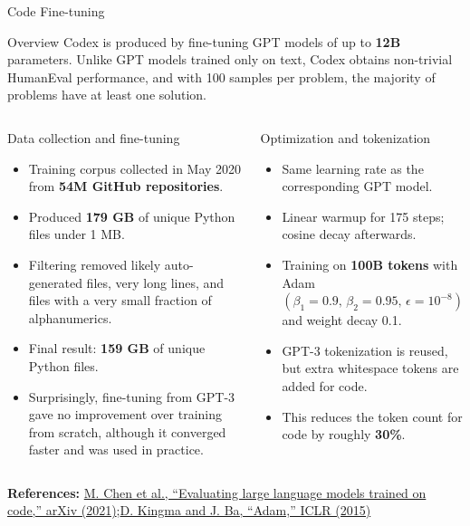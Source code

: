 \documentclass[aspectratio=43,9pt]{beamer}
\newcommand{\srclink}[2]{\href{#2}{\textcolor{black!68}{#1}}}
\newcommand{\sep}{;\hspace{0.35em}}
\newcommand{\refline}[2][References]{%
  \vfill
  {\raggedright\fontsize{5.1}{5.5}\selectfont\color{black!68}\textbf{#1:} #2\par}%
}
\newcommand{\srcChen}{\srclink{M. Chen et al., ``Evaluating large language models trained on code,'' arXiv (2021)}{https://arxiv.org/abs/2107.03374}}
\newcommand{\srcKingmaBa}{\srclink{D. Kingma and J. Ba, ``Adam,'' ICLR (2015)}{https://arxiv.org/abs/1412.6980}}
\begin{document}
\begin{frame}{Code Fine-tuning}
\scriptsize
\begin{block}{Overview}
Codex is produced by fine-tuning GPT models of up to \textbf{12B} parameters. Unlike GPT models trained only on text, Codex obtains non-trivial HumanEval performance, and with 100 samples per problem, the majority of problems have at least one solution.
\end{block}

\begin{columns}[T,totalwidth=\textwidth]
\begin{block}{Data collection and fine-tuning}
\begin{itemize}
  \item Training corpus collected in May 2020 from \textbf{54M GitHub repositories}.
  \item Produced \textbf{179 GB} of unique Python files under 1 MB.
  \item Filtering removed likely auto-generated files, very long lines, and files with a very small fraction of alphanumerics.
  \item Final result: \textbf{159 GB} of unique Python files.
  \item Surprisingly, fine-tuning from GPT-3 gave no improvement over training from scratch, although it converged faster and was used in practice.
\end{itemize}
\end{block}

\begin{block}{Optimization and tokenization}
\begin{itemize}
  \item Same learning rate as the corresponding GPT model.
  \item Linear warmup for 175 steps; cosine decay afterwards.
  \item Training on \textbf{100B tokens} with Adam \((\beta_1=0.9,\,\beta_2=0.95,\,\epsilon=10^{-8})\) and weight decay 0.1.
  \item GPT-3 tokenization is reused, but extra whitespace tokens are added for code.
  \item This reduces the token count for code by roughly \textbf{30\%}.
\end{itemize}
\end{block}
\end{columns}

\refline{\srcChen\sep \srcKingmaBa}
\end{frame}
\end{document}
